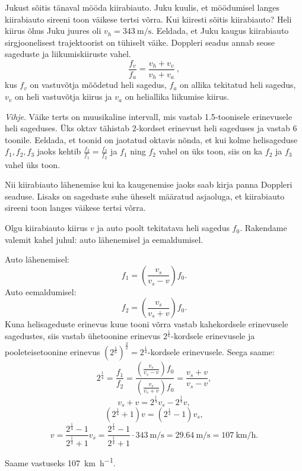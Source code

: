 
Jukust sõitis tänaval mööda kiirabiauto. Juku kuulis, et möödumisel langes kiirabiauto sireeni toon väikese tertsi võrra. Kui kiiresti sõitis kiirabiauto? Heli kiirus õhus Juku juures oli $v_h = \SI{343}{\meter\per\second}$. Eeldada, et Juku kaugus kiirabiauto sirgjoonelisest trajektoorist on tühiselt väike. Doppleri seadus annab seose sageduste ja liikumiskiiruste vahel.
\[ \frac{f_v}{f_a} = \frac{v_h + v_v}{v_h + v_a} \ , \]
kus \(f_v\) on vastuvõtja mõõdetud heli sagedus, \(f_a\) on allika tekitatud heli sagedus, \(v_v\) on heli vastuvõtja kiirus ja \(v_a\) on heliallika liikumise kiirus.

\emph{Vihje}. Väike terts on muusikaline intervall, mis vastab \num{1.5}-toonisele erinevusele heli sageduses. Üks oktav tähistab 2-kordset erinevust heli sageduses ja vastab 6 toonile. Eeldada, et toonid on jaotatud oktavis nõnda, et kui kolme helisageduse $f_1, f_2, f_3$ jaoks kehtib $\frac{f_2}{f_1} = \frac{f_3}{f_2}$ ja $f_1$ ning $f_2$ vahel on üks toon, siis on ka $f_2$ ja $f_3$ vahel üks toon.

\hint
Nii kiirabiauto lähenemise kui ka kaugenemise jaoks saab kirja panna Doppleri seaduse. Lisaks on sageduste suhe üheselt määratud asjaoluga, et kiirabiauto sireeni toon langes väikese tertsi võrra.

\solu
Olgu kiirabiauto kiirus $v$ ja auto poolt tekitatava heli sagedus $f_0$. Rakendame valemit kahel juhul: auto lähenemisel ja eemaldumisel.

Auto lähenemisel:
\[f_1 = \left(\frac{v_s}{v_s - v}\right)f_0.\]
Auto eemaldumisel:
\[f_2 = \left(\frac{v_s}{v_s + v}\right)f_0.\]
Kuna helisageduste erinevus kuue tooni võrra vastab kahekordsele erinevusele sagedustes, siis vastab ühetoonine erinevus $2^{\frac 1 6}$-kordsele erinevusele ja pooleteisetoonine erinevus $\left(2^{\frac 1 6}\right)^{\frac 3 2} = 2^{\frac 1 4}$-kordsele erinevusele. Seega saame:
\[2^{\frac 1 4} = \frac{f_1}{f_2} = \frac{(\frac{v_s}{v_s - v})f_0}{(\frac{v_s}{v_s + v})f_0} = \frac{v_s + v}{v_s - v},\]
\[v_s + v = 2^{\frac 1 4}v_s - 2^{\frac 1 4}v,\]
\[(2^{\frac 1 4} + 1)v = (2^{\frac 1 4} - 1)v_s,\]
\[v = \frac{2^{\frac 1 4} - 1}{2^{\frac 1 4} + 1}v_s = \frac{2^{\frac 1 4} - 1}{2^{\frac 1 4} + 1} \cdot \SI{343}{\meter\per\second} = \SI{29.64}{\meter\per\second} = \SI{107}{\kilo\meter\per\hour}. \]

Saame vastuseks \SI{107}{\kilo\meter\per\hour}.

